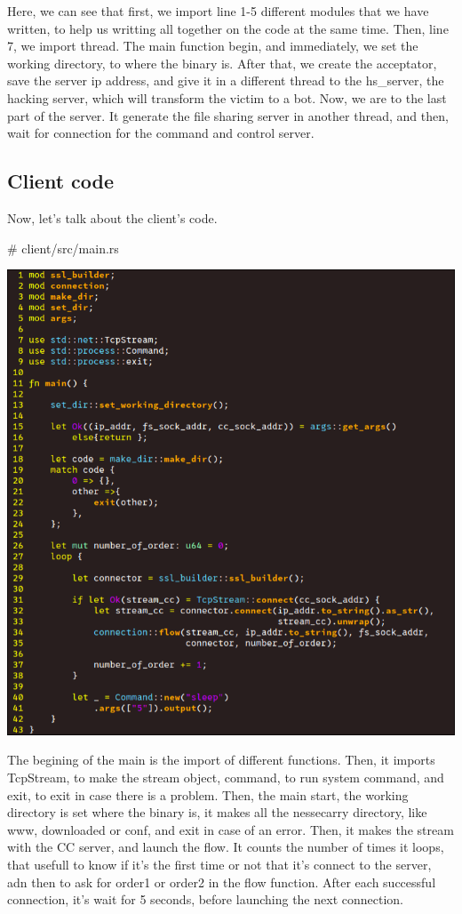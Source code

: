 \documentclass[../main.tex]{subfiles}
\begin{document}
    Here, we can see that first, we import line 1-5 different modules that we have written, to help us writting all together on the code at the same time.
    Then, line 7, we import thread.
    The main function begin, and immediately, we set the working directory, to where the binary is.
    After that, we create the acceptator, save the server ip address, and give it in a different thread to the hs\_server, the hacking server, which will transform the victim to a bot.
    Now, we are to the last part of the server.
    It generate the file sharing server in another thread, and then, wait for connection for the command and control server.

    
	\vspace{10pt}

	\subsection{Client code}

    Now, let's talk about the client's code.

    \# client/src/main.rs

    \includegraphics[width=450pt]{client_main.png}

    The begining of the main is the import of different functions.
    Then, it imports TcpStream, to make the stream object, command, to run system command, and exit, to exit in case there is a problem.
    Then, the main start, the working directory is set where the binary is, it makes all the nessecarry directory, like www, downloaded or conf, and exit in case of an error.
    Then, it makes the stream with the CC server, and launch the flow. 
    It counts the number of times it loops, that usefull to know if it's the first time or not that it's connect to the server, adn then to ask for order1 or order2 in the flow function.
    After each successful connection, it's wait for 5 seconds, before launching the next connection.
\end{document}
